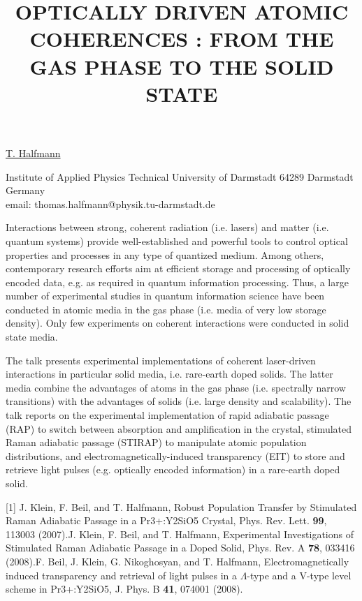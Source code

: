 \title{OPTICALLY DRIVEN ATOMIC COHERENCES : FROM THE GAS PHASE TO THE SOLID STATE}

\underline{T. Halfmann}


Institute of Applied Physics
Technical University of Darmstadt
64289 Darmstadt
Germany\\
email: thomas.halfmann@physik.tu-darmstadt.de

Interactions between strong, coherent radiation (i.e. lasers) and matter (i.e. quantum systems) provide well-established and powerful tools to control optical properties and processes in any type of quantized medium. Among others, contemporary research efforts aim at efficient storage and processing of optically encoded data, e.g. as required in quantum information processing. Thus, a large number of experimental studies in quantum information science have been conducted in atomic media in the gas phase (i.e. media of very low storage density). Only few experiments on coherent interactions were conducted in solid state media.

The talk presents experimental implementations of coherent laser-driven interactions in particular solid media, i.e. rare-earth doped solids. The latter media combine the advantages of atoms in the gas phase (i.e. spectrally narrow transitions) with the advantages of solids (i.e. large density and scalability). The talk reports on the experimental implementation of rapid adiabatic passage (RAP) to switch between absorption and amplification in the crystal, stimulated Raman adiabatic passage (STIRAP) to manipulate atomic population distributions, and electromagnetically-induced transparency (EIT) to store and retrieve light pulses (e.g. optically encoded information) in a rare-earth doped solid.

[1] J. Klein, F. Beil, and T. Halfmann, Robust Population Transfer by Stimulated Raman Adiabatic Passage in a Pr3+:Y2SiO5 Crystal, Phys. Rev. Lett. \textbf{99}, 113003 (2007).\newline
[2] J. Klein, F. Beil, and T. Halfmann, Experimental Investigations of Stimulated Raman Adiabatic Passage in a Doped Solid, Phys. Rev. A \textbf{78}, 033416 (2008).\newline
[3] F. Beil, J. Klein, G. Nikoghosyan, and T. Halfmann, Electromagnetically induced transparency and retrieval of light pulses in a $\Lambda$-type and a V-type level scheme in Pr3+:Y2SiO5, J. Phys. B \textbf{41}, 074001 (2008).

\vspace{\baselineskip}